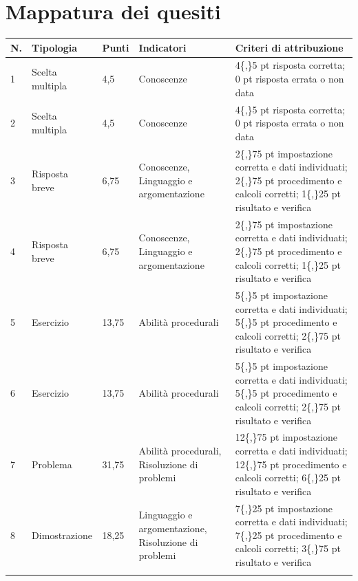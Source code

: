 \documentclass[11pt,a4paper]{article}
\begin{document}
\section*{Mappatura dei quesiti}
{\small
\begin{longtable}{@{}p{0.7cm}p{2.1cm}p{1.2cm}p{3.9cm}p{5.8cm}@{}}
\toprule
\textbf{N.} & \textbf{Tipologia} & \textbf{Punti} & \textbf{Indicatori} & \textbf{Criteri di attribuzione} \\
\midrule
\endhead

1 & Scelta multipla & 4,5 & Conoscenze & 4\{,\}5 pt risposta corretta; 0 pt risposta errata o non data \\
\addlinespace

2 & Scelta multipla & 4,5 & Conoscenze & 4\{,\}5 pt risposta corretta; 0 pt risposta errata o non data \\
\addlinespace

3 & Risposta breve & 6,75 & Conoscenze, Linguaggio e argomentazione & 2\{,\}75 pt impostazione corretta e dati individuati; 2\{,\}75 pt procedimento e calcoli corretti; 1\{,\}25 pt risultato e verifica \\
\addlinespace

4 & Risposta breve & 6,75 & Conoscenze, Linguaggio e argomentazione & 2\{,\}75 pt impostazione corretta e dati individuati; 2\{,\}75 pt procedimento e calcoli corretti; 1\{,\}25 pt risultato e verifica \\
\addlinespace

5 & Esercizio & 13,75 & Abilità procedurali & 5\{,\}5 pt impostazione corretta e dati individuati; 5\{,\}5 pt procedimento e calcoli corretti; 2\{,\}75 pt risultato e verifica \\
\addlinespace

6 & Esercizio & 13,75 & Abilità procedurali & 5\{,\}5 pt impostazione corretta e dati individuati; 5\{,\}5 pt procedimento e calcoli corretti; 2\{,\}75 pt risultato e verifica \\
\addlinespace

7 & Problema & 31,75 & Abilità procedurali, Risoluzione di problemi & 12\{,\}75 pt impostazione corretta e dati individuati; 12\{,\}75 pt procedimento e calcoli corretti; 6\{,\}25 pt risultato e verifica \\
\addlinespace

8 & Dimostrazione & 18,25 & Linguaggio e argomentazione, Risoluzione di problemi & 7\{,\}25 pt impostazione corretta e dati individuati; 7\{,\}25 pt procedimento e calcoli corretti; 3\{,\}75 pt risultato e verifica \\
\addlinespace

\bottomrule
\end{longtable}
}
\end{document}
